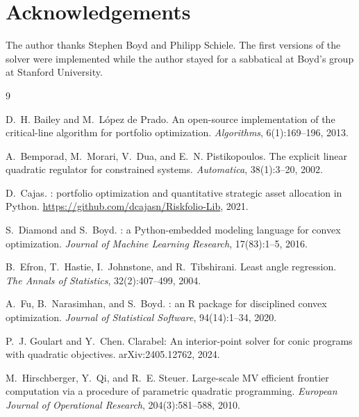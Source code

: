 \documentclass[11pt]{article}
\begin{document}
\section*{Acknowledgements}

The author thanks Stephen Boyd and Philipp Schiele. The first versions of the
solver were implemented while the author stayed for a sabbatical at Boyd's group
at Stanford University.

\begin{thebibliography}{9}

D.~H. Bailey and M.~L\'opez de Prado.
\newblock An open-source implementation of the critical-line algorithm for portfolio
optimization.
\newblock \emph{Algorithms}, 6(1):169--196, 2013.

A.~Bemporad, M.~Morari, V.~Dua, and E.~N. Pistikopoulos.
\newblock The explicit linear quadratic regulator for constrained systems.
\newblock \emph{Automatica}, 38(1):3--20, 2002.

D.~Cajas.
: portfolio optimization and quantitative strategic
asset allocation in {Python}.
\newblock \url{https://github.com/dcajasn/Riskfolio-Lib}, 2021.

S.~Diamond and S.~Boyd.
: a {Python}-embedded modeling language for convex optimization.
\newblock \emph{Journal of Machine Learning Research}, 17(83):1--5, 2016.

B.~Efron, T.~Hastie, I.~Johnstone, and R.~Tibshirani.
\newblock Least angle regression.
\newblock \emph{The Annals of Statistics}, 32(2):407--499, 2004.

A.~Fu, B.~Narasimhan, and S.~Boyd.
: an {R} package for disciplined convex optimization.
\newblock \emph{Journal of Statistical Software}, 94(14):1--34, 2020.

P.~J. Goulart and Y.~Chen.
\newblock Clarabel: An interior-point solver for conic programs with quadratic objectives.
\newblock arXiv:2405.12762, 2024.

M.~Hirschberger, Y.~Qi, and R.~E. Steuer.
\newblock Large-scale MV efficient frontier computation via a procedure of
parametric quadratic programming.
\newblock \emph{European Journal of Operational Research}, 204(3):581--588, 2010.


\end{thebibliography}
\end{document}
